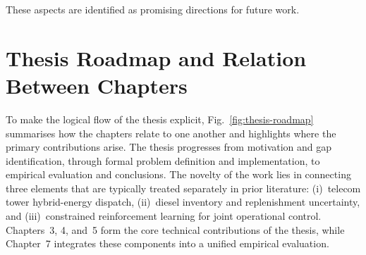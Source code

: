 These aspects are identified as promising directions for future work.
\section{Thesis Roadmap and Relation Between Chapters}

To make the logical flow of the thesis explicit,
Fig.~\ref{fig:thesis-roadmap} summarises how the chapters relate to
one another and highlights where the primary contributions arise. The
thesis progresses from motivation and gap identification, through formal
problem definition and implementation, to empirical evaluation and
conclusions. The novelty of the work lies in connecting three elements
that are typically treated separately in prior literature:
(i)~telecom tower hybrid-energy dispatch,
(ii)~diesel inventory and replenishment uncertainty, and
(iii)~constrained reinforcement learning for joint operational control.
Chapters~3, 4, and~5 form the core technical contributions of the thesis,
while Chapter~7 integrates these components into a unified empirical
evaluation.

